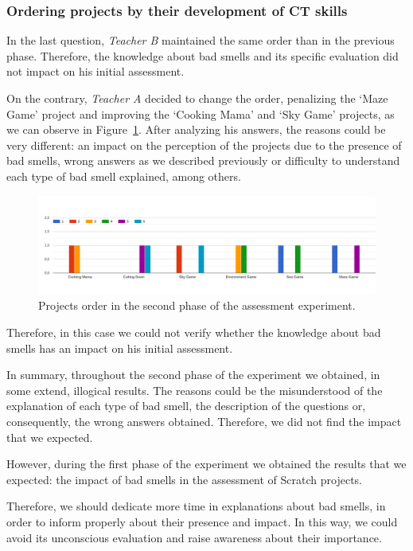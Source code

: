 \subsubsection{Ordering projects by their development of CT skills}
\label{subsubsec:projects_order_2}

In the last question, \textit{Teacher B} maintained the same order than in the previous phase. Therefore, the knowledge about bad smells and its specific evaluation did not impact on his initial assessment.

On the contrary, \textit{Teacher A} decided to change the order, penalizing the `Maze Game' project and improving the `Cooking Mama' and `Sky Game' projects, as we can observe in Figure~\ref{fig:projects_order_2}. After analyzing his answers, the reasons could be very different: an impact on the perception of the projects due to the presence of bad smells, wrong answers as we described previously or difficulty to understand each type of bad smell explained, among others.

\begin{figure}
    \centering
    \includegraphics[width=16cm,                         keepaspectratio]{img/order_projects_2.png}
    \caption{Projects order in the second phase of the assessment experiment.}
    \label{fig:projects_order_2}
\end{figure}

Therefore, in this case we could not verify whether the knowledge about bad smells has an impact on his initial assessment.


\hfill

In summary, throughout the second phase of the experiment we obtained, in some extend, illogical results. The reasons could be the misunderstood of the explanation of each type of bad smell, the description of the questions or, consequently, the wrong answers obtained. Therefore, we did not find the impact that we expected.

However, during the first phase of the experiment we obtained the results that we expected: the impact of bad smells in the assessment of Scratch projects. 

Therefore, we should dedicate more time in explanations about bad smells, in order to inform properly about their presence and impact. In this way, we could avoid its unconscious evaluation and raise awareness about their importance.
